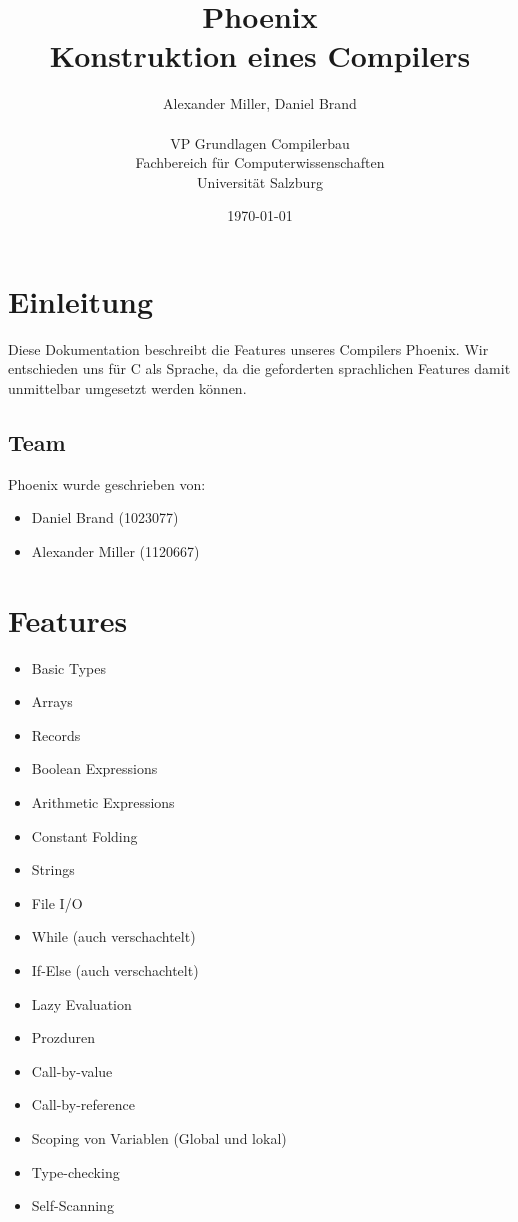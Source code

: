 \documentclass[a4paper,12pt]{article}
\title{Phoenix \\ \large Konstruktion eines Compilers}
\author{Alexander Miller, Daniel Brand \\ \\
		VP Grundlagen Compilerbau \\
		Fachbereich für Computerwissenschaften \\
		Universität Salzburg}
\date{\today}
\begin{document}
	\maketitle
	\tableofcontents
	\newpage

	\section{Einleitung}
	Diese Dokumentation beschreibt die Features unseres Compilers Phoenix.
	Wir entschieden uns für C als Sprache, da die geforderten sprachlichen Features damit unmittelbar umgesetzt werden können.

	\subsection{Team}
	Phoenix wurde geschrieben von:
	\begin{itemize}
		\item Daniel Brand (1023077)
		\item Alexander Miller (1120667)
	\end{itemize}

	\section{Features}
	\begin{multicols}{2}
	\begin{itemize}
		\item Basic Types
		\item Arrays
		\item Records
		\item Boolean Expressions
		\item Arithmetic Expressions
		\item Constant Folding
		\item Strings
		\item File I/O
		\item While (auch verschachtelt)
		\item If-Else (auch verschachtelt)
		\item Lazy Evaluation
		\item Prozduren
		\item Call-by-value
		\item Call-by-reference
		\item Scoping von Variablen (Global und lokal)
		\item Type-checking
		\item Self-Scanning
	\end{itemize}
	\end{multicols}
\end{document}
